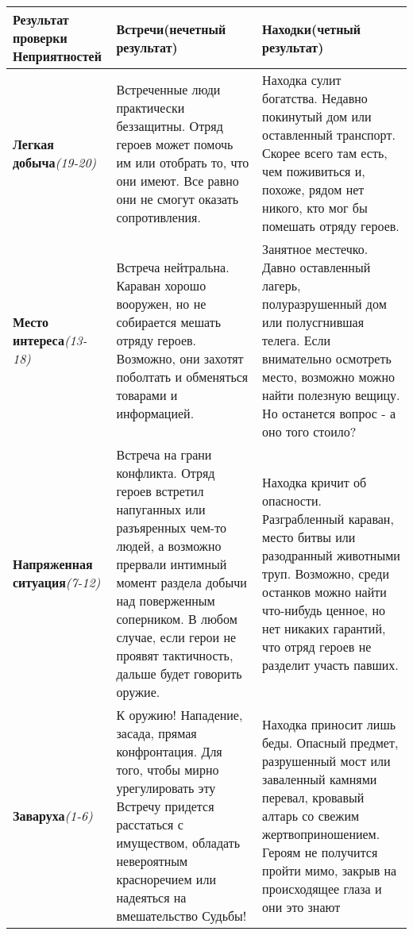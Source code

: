 \begin{center}
\begin{tabular}{|p{3cm}|p{6.5cm}|p{6.5cm}|}
\hline
\textbf{Результат проверки Неприятностей} & \textbf{Встречи(нечетный результат)} & \textbf{Находки(четный результат)}
\\ \hline
\textbf{Легкая добыча}\newline\textit{(19-20)} & Встреченные люди практически беззащитны. Отряд героев может помочь им или отобрать то, что они имеют. Все равно они не смогут оказать сопротивления. & Находка сулит богатства. Недавно покинутый дом или оставленный транспорт. Скорее всего там есть, чем поживиться и, похоже, рядом нет никого, кто мог бы помешать отряду героев.
\\ \hline
\textbf{Место интереса}\newline\textit{(13-18)} & Встреча нейтральна. Караван хорошо вооружен, но не собирается мешать отряду героев. Возможно, они захотят поболтать и обменяться товарами и информацией. & Занятное местечко. Давно оставленный лагерь, полуразрушенный дом или полусгнившая телега. Если внимательно осмотреть место, возможно можно найти полезную вещицу. Но останется вопрос - а оно того стоило?
\\ \hline
\textbf{Напряженная ситуация}\newline\textit{(7-12)} & Встреча на грани конфликта. Отряд героев встретил напуганных или разъяренных чем-то людей, а возможно прервали интимный момент раздела добычи над поверженным соперником. В любом случае, если герои не проявят тактичность, дальше будет говорить оружие. & Находка кричит об опасности. Разграбленный караван, место битвы или разодранный животными труп. Возможно, среди останков можно найти что-нибудь ценное, но нет никаких гарантий, что отряд героев не разделит участь павших.
\\ \hline
\textbf{Заваруха}\newline\textit{(1-6)} & К оружию! Нападение, засада, прямая конфронтация. Для того, чтобы мирно урегулировать эту Встречу придется расстаться с имуществом, обладать невероятным красноречием или надеяться на вмешательство Судьбы! & Находка приносит лишь беды. Опасный предмет, разрушенный мост или заваленный камнями перевал, кровавый алтарь со свежим жертвоприношением. Героям не получится пройти мимо, закрыв на происходящее глаза и они это знают
\\ \hline
\end{tabular}
\end{center}

